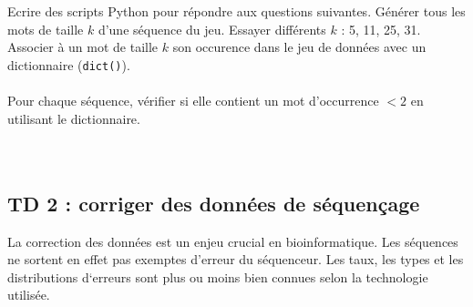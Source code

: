 \documentclass{article}
\begin{document}
Ecrire des scripts Python pour répondre aux questions suivantes. Générer tous les mots de taille $k$ d'une séquence du jeu. Essayer différents $k$ : 5, 11, 25, 31. Associer à un mot de taille $k$ son occurence dans le jeu de données avec un dictionnaire (\texttt{dict()}).\\
\noindent{}\\

Pour chaque séquence, vérifier si elle contient un mot d'occurrence $< 2$ en utilisant le dictionnaire.\\
\noindent{}\\

\noindent{}\\






\subsection*{TD 2 : corriger des données de séquençage}
La correction des données est un enjeu crucial en bioinformatique. Les séquences ne sortent en effet pas exemptes d'erreur du séquenceur. Les taux, les types et les distributions d`erreurs sont plus ou moins bien connues selon la technologie utilisée.
\end{document}
